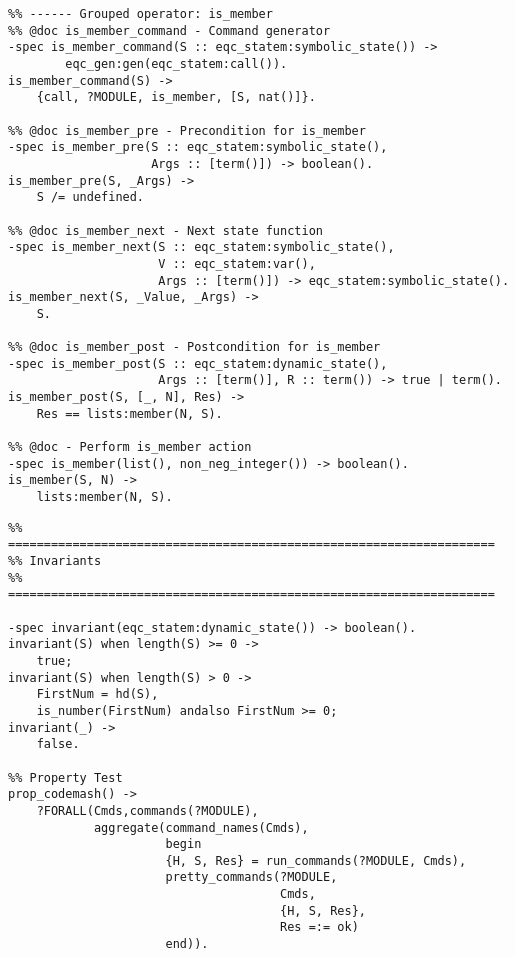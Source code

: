 \documentclass[presentation, bigger]{beamer}
\begin{document}
\begin{frame}[fragile,shrink,label=sec-]{}
 \begin{verbatim}
%% ------ Grouped operator: is_member
%% @doc is_member_command - Command generator
-spec is_member_command(S :: eqc_statem:symbolic_state()) ->
        eqc_gen:gen(eqc_statem:call()).
is_member_command(S) ->
    {call, ?MODULE, is_member, [S, nat()]}.

%% @doc is_member_pre - Precondition for is_member
-spec is_member_pre(S :: eqc_statem:symbolic_state(),
                    Args :: [term()]) -> boolean().
is_member_pre(S, _Args) ->
    S /= undefined.

%% @doc is_member_next - Next state function
-spec is_member_next(S :: eqc_statem:symbolic_state(),
                     V :: eqc_statem:var(),
                     Args :: [term()]) -> eqc_statem:symbolic_state().
is_member_next(S, _Value, _Args) ->
    S.

%% @doc is_member_post - Postcondition for is_member
-spec is_member_post(S :: eqc_statem:dynamic_state(),
                     Args :: [term()], R :: term()) -> true | term().
is_member_post(S, [_, N], Res) ->
    Res == lists:member(N, S).

%% @doc - Perform is_member action
-spec is_member(list(), non_neg_integer()) -> boolean().
is_member(S, N) ->
    lists:member(N, S).
\end{verbatim}
\end{frame}
\begin{frame}[fragile,shrink,label=sec-]{}
 \begin{verbatim}
%% ====================================================================
%% Invariants
%% ====================================================================

-spec invariant(eqc_statem:dynamic_state()) -> boolean().
invariant(S) when length(S) >= 0 ->
    true;
invariant(S) when length(S) > 0 ->
    FirstNum = hd(S),
    is_number(FirstNum) andalso FirstNum >= 0;
invariant(_) ->
    false.

%% Property Test
prop_codemash() ->
    ?FORALL(Cmds,commands(?MODULE),
            aggregate(command_names(Cmds),
                      begin
                      {H, S, Res} = run_commands(?MODULE, Cmds),
                      pretty_commands(?MODULE,
                                      Cmds,
                                      {H, S, Res},
                                      Res =:= ok)
                      end)).
\end{verbatim}
\end{frame}
\end{document}
